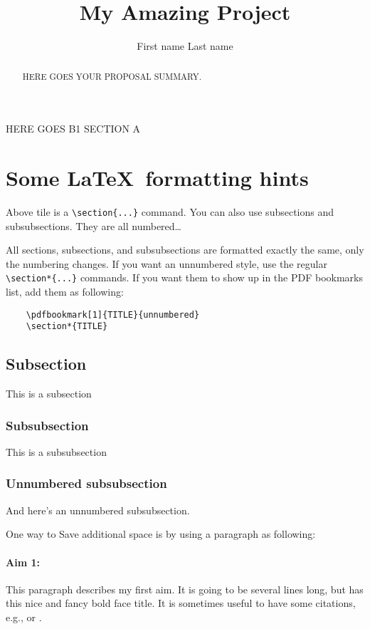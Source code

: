 \documentclass[11pt, a4paper]{article}
\author[Last name]{First name Last name}
\title{My Amazing Project}
\begin{document}
\maketitle

\begin{abstract}
HERE GOES YOUR PROPOSAL SUMMARY.
\end{abstract}



\begin{b1-sec-a}
HERE GOES B1 SECTION A

\section{Some \LaTeX\ formatting hints}

Above tile is a \verb=\section{...}= command. You can also use subsections and subsubsections. They are all numbered\dots

All sections, subsections, and subsubsections are formatted exactly the same, only the numbering changes. If you want an unnumbered style, use the regular \verb=\section*{...}= commands.
If you want them to show up in the PDF bookmarks list, add them as following:
\begin{verbatim}
    \pdfbookmark[1]{TITLE}{unnumbered}
    \section*{TITLE}
\end{verbatim}

\subsection{Subsection}

This is a subsection 

\subsubsection{Subsubsection}

This is a subsubsection

\subsubsection*{Unnumbered subsubsection}
And here's an unnumbered subsubsection.

One way to Save additional space is by using a paragraph as following:

\paragraph{Aim 1:} This paragraph describes my first aim. It is going to be several lines long, but has this nice and fancy bold face title.
It is sometimes useful to have some citations, e.g., \citet{Mayer2010} or \citet{b2fh}.
\end{b1-sec-a}
\end{document}
